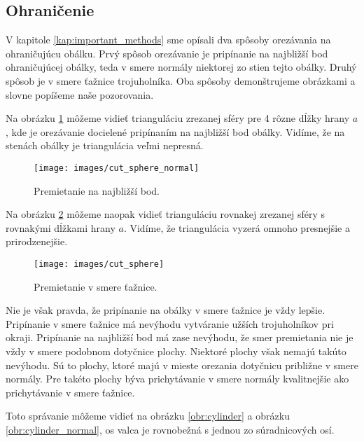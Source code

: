 \newpage

\subsection{Ohraničenie}

V kapitole \ref{kap:important_methods} sme opísali dva spôsoby orezávania na ohraničujúcu obálku.
Prvý spôsob orezávanie je pripínanie na najbližší bod ohraničujúcej obálky, teda v smere normály 
niektorej zo stien tejto obálky. Druhý spôsob je v smere ťažnice trojuholníka. Oba spôsoby demonštrujeme obrázkami
a slovne popíšeme naše pozorovania.

Na obrázku \ref{obr:cut_sphere_normal} môžeme vidieť trianguláciu zrezanej sféry pre 4 rôzne dĺžky 
hrany $a$, kde je orezávanie docielené pripínaním na najbližší bod obálky. Vidíme, že na stenách obálky 
je triangulácia veľmi nepresná.

\begin{figure}
    \centerline{\texttt{[image: images/cut\_sphere\_normal]}}
    \caption[Ohraničená triangulácia gule -- premietanie na najbližší bod]
    {Premietanie na najbližší bod.}
    \label{obr:cut_sphere_normal}
\end{figure}

Na obrázku \ref{obr:cut_sphere} môžeme naopak vidieť trianguláciu rovnakej zrezanej sféry s rovnakými 
dĺžkami hrany $a$.
Vidíme, že triangulácia vyzerá omnoho presnejšie a prirodzenejšie.

\begin{figure}
    \centerline{\texttt{[image: images/cut\_sphere]}}
    \caption[Ohraničená triangulácia gule -- premietanie v smere ťažnice]
    {Premietanie v smere ťažnice.}
    \label{obr:cut_sphere}
\end{figure}

Nie je však pravda, že pripínanie na obálky v smere ťažnice je vždy lepšie.
Pripínanie v smere ťažnice má nevýhodu vytváranie užších trojuholníkov pri 
okraji. Pripínanie na najbližší bod má zase nevýhodu, že smer premietania
nie je vždy v smere podobnom dotyčnice plochy.
Niektoré plochy však nemajú takúto nevýhodu.
Sú to plochy, ktoré majú v mieste orezania dotyčnicu približne v smere normály.
Pre takéto plochy býva prichytávanie v smere normály kvalitnejšie ako 
prichytávanie v smere ťažnice.

Toto správanie môžeme vidieť na obrázku \ref{obr:cylinder} a obrázku \ref{obr:cylinder_normal}, 
os valca je rovnobežná s jednou zo súradnicových osí.

